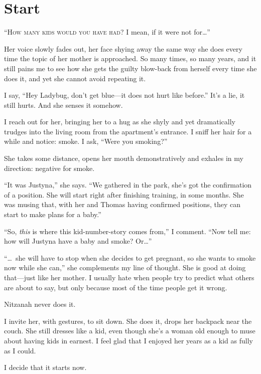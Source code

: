 \chapter*{Start}\label{start}

\enquote{\noindent\textsc{{How many kids would you have had?}} I mean, if it were not for\dots{}}

Her voice slowly fades out, her face shying away the same way she does every time the topic of her mother is approached. So many times, so many years, and it still pains me to see how she gets the guilty blow-back from herself every time she does it, and yet she cannot avoid repeating it.

I say, \enquote{Hey Ladybug, don't get blue---it does not hurt like before.} It's a lie, it still hurts. And she senses it somehow.

I reach out for her, bringing her to a hug as she shyly and yet dramatically trudges into the living room from the apartment's entrance. I sniff her hair for a while and notice: smoke. I ask, \enquote{Were you smoking?}

She takes some distance, opens her mouth demonstratively and exhales in my direction: negative for smoke. 

\enquote{It was Justyna,} she says. \enquote{We gathered in the park, she's got the confirmation of a position. She will start right after finishing training, in some months. She was musing that, with her and Thomas having confirmed positions, they can start to make plans for a baby.}

\enquote{So, \emph{this} is where this kid-number-story comes from,} I comment. \enquote{Now tell me: how will Justyna have a baby and smoke? Or\dots{}}

\enquote{\dots~she will have to stop when she decides to get pregnant, so she wants to smoke now while she can,} she complements my line of thought. She is good at doing that---just like her mother. I usually hate when people try to predict what others are about to say, but only because most of the time people get it wrong. 

Nitzanah never does it. 

I invite her, with gestures, to sit down. She does it, drops her backpack near the couch. She still dresses like a kid, even though she's a woman old enough to muse about having kids in earnest. I feel glad that I enjoyed her years as a kid as fully as I could. 

I decide that it starts now. 

